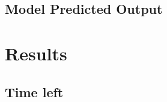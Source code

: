 \documentclass{article}
\begin{document}
    \subsection{Model Predicted Output}
    
    \section{Results}
    
    \subsection{Time left }
    
    \section{}
    
\end{document}
